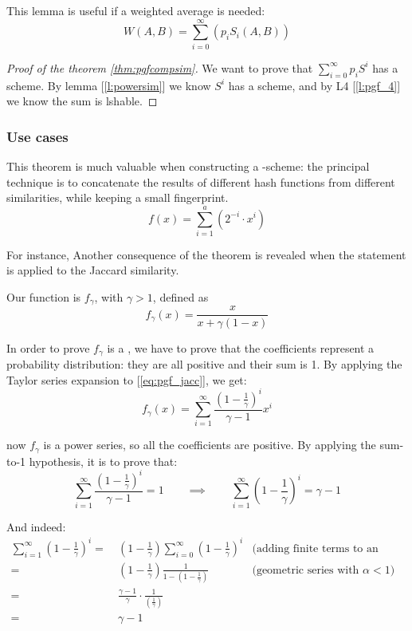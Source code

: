 This lemma is useful if a weighted average is needed:
\[
    W(A,B) = \sum_{i=0}^{\infty}(p_i S_i(A, B))
\]

\begin{proof}[Proof of the theorem \ref{thm:pgfcompsim}]
    We want to prove that $\sum_{i = 0}^{\infty} p_i S^i$ has a scheme. By lemma [\ref{l:powersim}] we know $S^i$ has a scheme, and by L4 [\ref{l:pgf_4}] we know the sum is lshable.
\end{proof}


\subsubsection{Use cases}

This theorem is much valuable when constructing a \lsh-scheme: the principal technique is to concatenate the results of different hash functions from different similarities, while keeping a small fingerprint.
\[
    f(x) = \sum_{i=1}^{a}(2^{-i} \cdot x^i)
\]

For instance, Another consequence of the theorem is revealed when the statement is applied to the Jaccard similarity.

Our function is $f_\gamma$, with $\gamma > 1$, defined as
\begin{equation} \label{eq:pgf_jacc}
    f_\gamma(x) = \frac{x}{x + \gamma(1 - x)}
\end{equation}

In order to prove $f_\gamma$ is a \pgf, we have to prove that the coefficients represent a probability distribution: they are all positive and their sum is 1. By applying the Taylor series expansion to [\ref{eq:pgf_jacc}], we get:
\[
    f_\gamma(x) = \sum_{i = 1}^{\infty} \frac{ \left( 1 - \frac{1}{\gamma} \right)^i }{\gamma - 1} x^i
\]

now $f_\gamma$ is a power series, so all the coefficients are positive. By applying the sum-to-1 hypothesis, it is to prove that:
\[
    \sum_{i = 1}^{\infty} \frac{ \left( 1 - \frac{1}{\gamma} \right)^i }{\gamma - 1} = 1 \qquad \implies \qquad \sum_{i = 1}^{\infty} \left( 1 - \frac{1}{\gamma} \right)^i = \gamma - 1
\]

And indeed:
\begin{align*}
        \sum_{i = 1}^{\infty} \left(1 - \frac{1}{\gamma} \right)^i
    =&\ \left( 1 - \frac{1}{\gamma} \right) \sum_{i = 0}^{\infty} \left( 1 - \frac{1}{\gamma} \right)^i & \text{(adding finite terms to an infinite series)} \\
    =&\ \left( 1 - \frac{1}{\gamma} \right) \frac{1}{1 - \left( 1 - \frac{1}{\gamma} \right)}           & \text{(geometric series with $\alpha < 1$)} \\
    =&\ \frac{\gamma - 1}{\gamma} \cdot \frac{1}{ \left( \frac{1}{\gamma} \right) }                     & \\
    =&\ \gamma - 1                                                                                      &
\end{align*}

